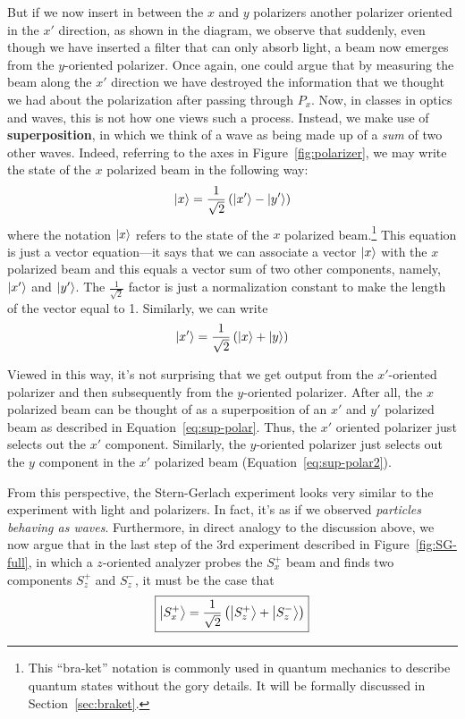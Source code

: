 But if we now insert in between the $x$ and $y$ polarizers another polarizer oriented in the $x'$ direction, as shown in the diagram, we observe that suddenly, even though we have inserted a filter that can only absorb light, a beam now emerges from the $y$-oriented polarizer. Once again, one could argue that by measuring the beam along the $x'$ direction we have destroyed the information that we thought we had about the polarization after passing through $P_x$. Now, in classes in optics and waves, this is not how one views such a process. Instead, we make use of \textbf{superposition}, in which we think of a wave as being made up of a \emph{sum} of two other waves. Indeed, referring to the axes in Figure~\ref{fig:polarizer}, we may write the state of the $x$ polarized beam in the following way:
\begin{equation}
	\ket{x} = \frac{1}{\sqrt{2}} \left( \ket{x'} - \ket{y'} \right) \label{eq:sup-polar}
\end{equation}
where the notation $\ket{x}$ refers to the state of the $x$ polarized beam.\footnote{This ``bra-ket'' notation is commonly used in quantum mechanics to describe quantum states without the gory details. It will be formally discussed in Section~\ref{sec:braket}.} This equation is just a vector equation---it says that we can associate a vector $\ket{x}$ with the $x$ polarized beam and this equals a vector sum of two other components, namely, $\ket{x'}$ and $\ket{y'}$. The $\frac{1}{\sqrt{2}}$ factor is just a normalization constant to make the length of the vector equal to 1. Similarly, we can write
\begin{equation}
\ket{x'} = \frac{1}{\sqrt{2}} \left( \ket{x} + \ket{y} \right) \label{eq:sup-polar2}
\end{equation}

Viewed in this way, it's not surprising that we get output from the $x'$-oriented polarizer and then subsequently from the $y$-oriented polarizer. After all, the $x$ polarized beam can be thought of as a superposition of an $x'$ and $y'$ polarized beam as described in Equation~\ref{eq:sup-polar}. Thus, the $x'$ oriented polarizer just selects out the $x'$ component. Similarly, the $y$-oriented polarizer just selects out the $y$ component in the $x'$ polarized beam (Equation~\ref{eq:sup-polar2}). \par

From this perspective, the Stern-Gerlach experiment looks very similar to the experiment with light and polarizers. In fact, it's as if we observed \emph{particles behaving as waves}. Furthermore, in direct analogy to the discussion above, we now argue that in the last step of the 3rd experiment described in Figure~\ref{fig:SG-full}, in which a $z$-oriented analyzer probes the $S_x^+$ beam and finds two components $S_z^+$ and $S_z^-$, it must be the case that
\begin{equation*}
	\boxed{\ket{S_x^+} = \frac{1}{\sqrt{2}} \left( \ket{S_z^+} + \ket{S_z^-} \right)}
\end{equation*}

